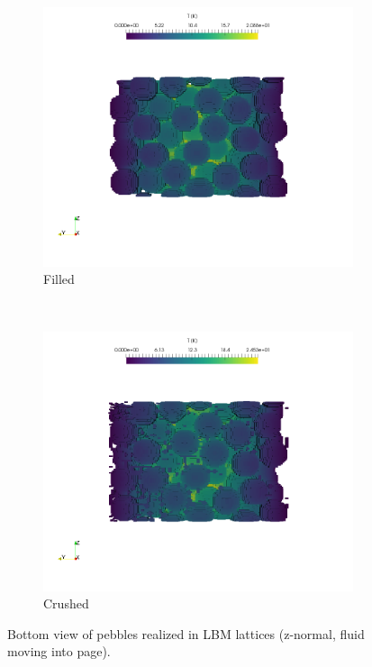 \begin{figure}[!ht]
    \centering
    \begin{subfigure}[b]{0.44\textwidth}
        \includegraphics[trim={6cm 6cm 5cm 0cm},clip, width = \textwidth]{figures/lbm/lbm-pebbles-x-normal-filled}
        \caption{Filled}\label{fig:lbm-pebble-temperatures-filled-x}
    \end{subfigure}
    ~
    \begin{subfigure}[b]{0.44\textwidth}
        \includegraphics[trim={6cm 6cm 5cm 0cm},clip, width = \textwidth]{figures/lbm/lbm-pebbles-x-normal-crushed}
        \caption{Crushed}\label{fig:lbm-pebble-temperatures-crushed-x}
    \end{subfigure}
    \caption{Bottom view of pebbles realized in LBM lattices (z-normal, fluid moving into page).}\label{fig:lbm-pebble-temperatures-x}
\end{figure}

